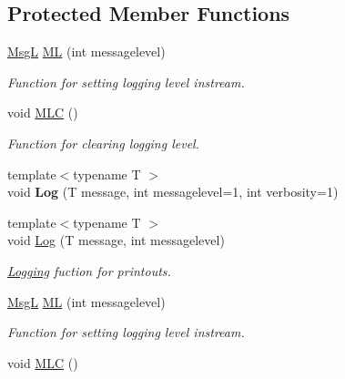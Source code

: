 \subsection*{Protected Member Functions}
\begin{DoxyCompactItemize}
\item 
\hyperlink{structMsgL}{Msg\-L} \hyperlink{classTool_aece350bc23e63656276b8338419dc54e}{M\-L} (int messagelevel)
\begin{DoxyCompactList}\small\item\em Function for setting logging level instream. \end{DoxyCompactList}\item 
\hypertarget{classTool_ae4da557812278419f6f8b8484df08115}{void \hyperlink{classTool_ae4da557812278419f6f8b8484df08115}{M\-L\-C} ()}\label{classTool_ae4da557812278419f6f8b8484df08115}

\begin{DoxyCompactList}\small\item\em Function for clearing logging level. \end{DoxyCompactList}\item 
\hypertarget{classTool_a46f7e599888302feefcf25e4f6cb4f9e}{{\footnotesize template$<$typename T $>$ }\\void {\bfseries Log} (T message, int messagelevel=1, int verbosity=1)}\label{classTool_a46f7e599888302feefcf25e4f6cb4f9e}

\item 
{\footnotesize template$<$typename T $>$ }\\void \hyperlink{classTool_ac65a2dfa2e3531fe8e05fe4112846fcf}{Log} (T message, int messagelevel)
\begin{DoxyCompactList}\small\item\em \hyperlink{classLogging}{Logging} fuction for printouts. \end{DoxyCompactList}\item 
\hyperlink{structMsgL}{Msg\-L} \hyperlink{classTool_aece350bc23e63656276b8338419dc54e}{M\-L} (int messagelevel)
\begin{DoxyCompactList}\small\item\em Function for setting logging level instream. \end{DoxyCompactList}\item 
\hypertarget{classTool_ae4da557812278419f6f8b8484df08115}{void \hyperlink{classTool_ae4da557812278419f6f8b8484df08115}{M\-L\-C} ()}\label{classTool_ae4da557812278419f6f8b8484df08115}


\end{DoxyCompactItemize}

